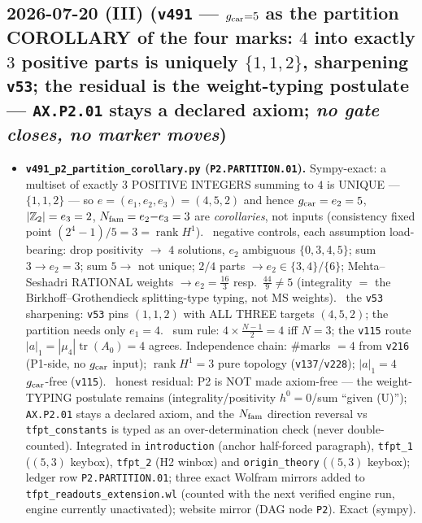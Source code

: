 \subsection*{2026-07-20 (III) (\texttt{v491} --- $g_{\mathrm{car}}{=}5$ as the partition COROLLARY of the four marks: $4$ into exactly $3$ positive parts is uniquely $\{1,1,2\}$, sharpening \texttt{v53}; the residual is the weight-typing postulate --- \texttt{AX.P2.01} stays a declared axiom; \emph{no gate closes, no marker moves})}
\begin{itemize}[leftmargin=1.5em]
\item \textbf{\texttt{v491\_p2\_partition\_corollary.py} (\texttt{P2.PARTITION.01}).} Sympy-exact: a
multiset of exactly $3$ POSITIVE INTEGERS summing to $4$ is UNIQUE --- $\{1,1,2\}$ --- so
$e=(e_1,e_2,e_3)=(4,5,2)$ and hence $g_{\mathrm{car}}=e_2=5$, $|\mathbb{Z}_2|=e_3=2$, $N_{\mathrm{fam}}=e_2{-}e_3=3$ are
\emph{corollaries}, not inputs (consistency fixed point $(2^4{-}1)/5=3=\operatorname{rank}H^1$).
\mE\ negative controls, each assumption load-bearing: drop positivity $\to$ $4$ solutions, $e_2$
ambiguous $\{0,3,4,5\}$; sum $3\to e_2{=}3$; sum $5\to$ not unique; $2/4$ parts $\to e_2\in\{3,4\}/\{6\}$;
Mehta--Seshadri RATIONAL weights $\to e_2=\tfrac{16}3$ resp.\ $\tfrac{44}9\neq5$ (integrality $=$ the
Birkhoff--Grothendieck splitting-type typing, not MS weights). \mE\ the \texttt{v53} sharpening:
\texttt{v53} pins $(1,1,2)$ with ALL THREE targets $(4,5,2)$; the partition needs only $e_1{=}4$.
\mE\ sum rule: $4\times\tfrac{N-1}2=4$ iff $N{=}3$; the \texttt{v115} route
$|a|_1=|\mu_4|\operatorname{tr}(A_0)=4$ agrees. Independence chain: $\#$marks $=4$ from \texttt{v216}
(P1-side, no $g_{\mathrm{car}}$ input); $\operatorname{rank}H^1=3$ pure topology (\texttt{v137}/\texttt{v228});
$|a|_1=4$ $g_{\mathrm{car}}$-free (\texttt{v115}). \mC\ honest residual: P2 is NOT made axiom-free --- the
weight-TYPING postulate remains (integrality/positivity $h^0{=}0$/sum ``given (U)'');
\texttt{AX.P2.01} stays a declared axiom, and the $N_{\mathrm{fam}}$ direction reversal vs
\texttt{tfpt\_constants} is typed as an over-determination check (never double-counted). Integrated in
\texttt{introduction} (anchor half-forced paragraph), \texttt{tfpt\_1} ($(5,3)$ keybox),
\texttt{tfpt\_2} (H2 winbox) and \texttt{origin\_theory} ($(5,3)$ keybox); ledger row
\texttt{P2.PARTITION.01}; three exact Wolfram mirrors added to
\texttt{tfpt\_readouts\_extension.wl} (counted with the next verified engine run, engine currently
unactivated); website mirror (DAG node \texttt{P2}). Exact (sympy).
\end{itemize}

